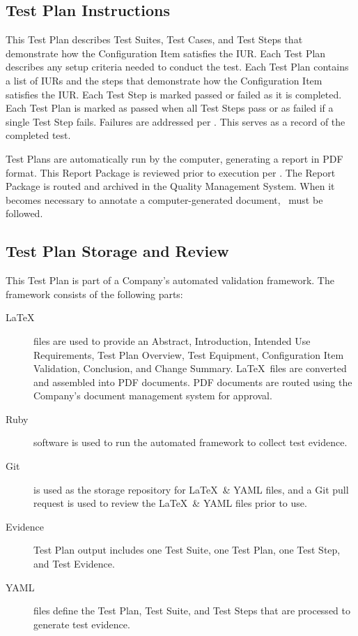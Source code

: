 \subsection{Test Plan Instructions}
This Test Plan describes Test Suites, Test Cases, and Test Steps that demonstrate
how the Configuration Item satisfies the IUR\@.  Each Test Plan describes any
setup criteria needed to conduct the test.  Each Test Plan contains a list of
IURs and the steps that demonstrate how the Configuration Item
satisfies the IUR\@.  Each Test Step is marked passed or failed as it is
completed.  Each Test Plan is marked as passed when all Test Steps pass or as failed
if a single Test Step fails.  Failures are addressed per \sopISS\@. This serves as
a record of the completed
test.

\tlcVspace

Test Plans are automatically run by the computer, generating a report in PDF
format.  This Report Package is reviewed prior to execution per \sopSDLC\@.  The
Report Package is routed and archived in the Quality Management System.  When it
becomes necessary to annotate a computer-generated document, \sopGDP\ must be
followed.

\subsection{Test Plan Storage and Review}
This Test Plan is part of a Company's automated validation framework.  The
framework consists of the following parts:
\begin{description}
  \item[\LaTeX] files are used to provide an Abstract, Introduction, Intended
    Use Requirements, Test Plan Overview, Test Equipment, Configuration
    Item Validation, Conclusion, and Change Summary.  \LaTeX\ files are converted
    and assembled into PDF documents.  PDF documents are routed using the Company's
    document management system for approval.

  \item[Ruby] software is used to run the automated framework to collect test
    evidence.

  \item[Git] is used as the storage repository for \LaTeX\ \& YAML files, and a Git
    pull request is used to review the \LaTeX\ \& YAML files prior to use.

  \item[Evidence] Test Plan output includes one Test Suite, one Test Plan, one Test
    Step, and Test Evidence.

  \item[YAML] files define the Test Plan, Test Suite, and Test Steps that are
    processed to generate test evidence.
\end{description}
